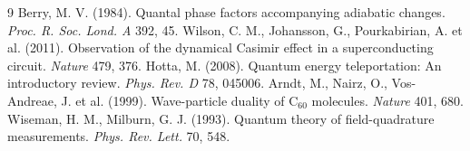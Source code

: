 \documentclass[12pt,a4paper]{article}
\begin{document}

\begin{thebibliography}{9}
 Berry, M. V. (1984). Quantal phase factors accompanying adiabatic changes. \emph{Proc. R. Soc. Lond. A} 392, 45.
 Wilson, C. M., Johansson, G., Pourkabirian, A. et al. (2011). Observation of the dynamical Casimir effect in a superconducting circuit. \emph{Nature} 479, 376.
 Hotta, M. (2008). Quantum energy teleportation: An introductory review. \emph{Phys. Rev. D} 78, 045006.
 Arndt, M., Nairz, O., Vos-Andreae, J. et al. (1999). Wave-particle duality of C$_{60}$ molecules. \emph{Nature} 401, 680.
 Wiseman, H. M., Milburn, G. J. (1993). Quantum theory of field-quadrature measurements. \emph{Phys. Rev. Lett.} 70, 548.
\end{thebibliography}
\end{document}
